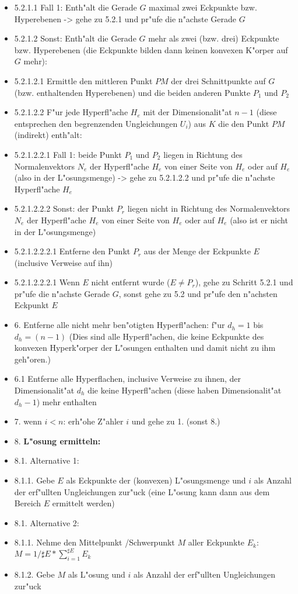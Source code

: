 \begin{itemize}
 \item [] 5.2.1.1 Fall 1: Enth"alt die Gerade $G$ maximal zwei Eckpunkte bzw. Hyperebenen -> gehe zu 5.2.1 und pr"ufe die n"achste Gerade $G$
 \item [] 5.2.1.2 Sonst: Enth"alt die Gerade $G$ mehr als zwei (bzw. drei) Eckpunkte bzw. Hyperebenen (die Eckpunkte bilden dann keinen konvexen K"orper auf $G$ mehr):
 \item [] 5.2.1.2.1 Ermittle den mittleren Punkt $PM$ der drei Schnittpunkte auf $G$ (bzw. enthaltenden Hyperebenen) und die beiden anderen Punkte $P_1$ und $P_2$
 \item [] 5.2.1.2.2 F"ur jede Hyperfl"ache $H_e$ mit der Dimensionalit"at $n-1$ (diese entsprechen den begrenzenden Ungleichungen $U_i$) aus $K$ die den Punkt $PM$ (indirekt) enth"alt:
 \item [] 5.2.1.2.2.1 Fall 1: beide Punkt $P_1$ und $P_2$ liegen in Richtung des Normalenvektors $N_e$ der Hyperfl"ache $H_e$ von einer Seite von $H_e$ oder auf $H_e$ (also in der L"osungsmenge) -> gehe zu 5.2.1.2.2 und pr"ufe die n"achste Hyperfl"ache $H_e$
 \item [] 5.2.1.2.2.2 Sonst: der Punkt $P_r$ liegen nicht in Richtung des Normalenvektors $N_e$ der Hyperfl"ache $H_e$ von einer Seite von $H_e$ oder auf $H_e$ (also ist er nicht in der L"osungsmenge)
 \item [] 5.2.1.2.2.2.1 Entferne den Punkt $P_r$ aus der Menge der Eckpunkte $E$ (inclusive Verweise auf ihn)
 \item [] 5.2.1.2.2.2.1 Wenn $E$ nicht entfernt wurde ($E \neq P_r$), gehe zu Schritt 5.2.1 und pr"ufe die n"achste Gerade $G$, sonst gehe zu 5.2 und pr"ufe den n"achsten Eckpunkt $E$
 \item [] 6. Entferne alle nicht mehr ben"otigten Hyperfl"achen: f"ur $d_h = 1$ bis $d_h = (n-1)$ (Dies sind alle Hyperfl"achen, die keine Eckpunkte des konvexen Hyperk"orper der L"osungen enthalten und damit nicht zu ihm geh"oren.)
 \item [] 6.1 Entferne alle Hyperflachen, inclusive Verweise zu ihnen, der Dimensionalit"at $d_h$ die keine Hyperfl"achen (diese haben Dimensionalit"at $d_h-1$) mehr enthalten
 \item [] 7. wenn $i < n$: erh"ohe Z"ahler $i$ und gehe zu 1. (sonst 8.)
 \item [] 8. \textbf{L"osung ermitteln:}
 \item [] 8.1. Alternative 1:
 \item [] 8.1.1. Gebe $E$ als Eckpunkte der (konvexen) L"osungsmenge und $i$ als Anzahl der erf"ullten Ungleichungen zur"uck (eine L"osung kann dann aus dem Bereich $E$ ermittelt werden)
 \item [] 8.1. Alternative 2:
 \item [] 8.1.1. Nehme den Mittelpunkt /Schwerpunkt $M$ aller Eckpunkte $E_k$: $M = 1 / \sharp E * \sum_{i=1}^{\sharp E} E_k$
 \item [] 8.1.2. Gebe $M$ als L"osung und $i$ als Anzahl der erf"ullten Ungleichungen zur"uck
\end{itemize}


